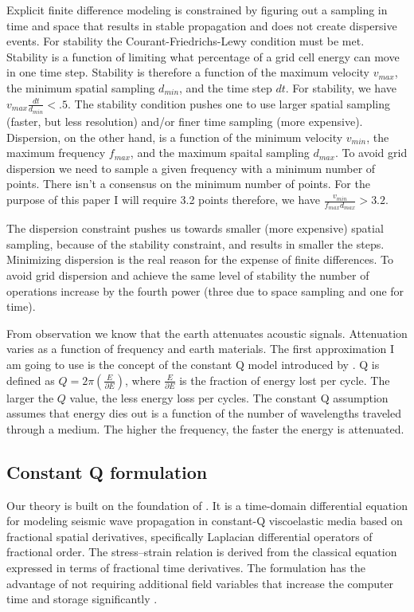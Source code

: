 \documentclass{paris17}
\begin{document}
Explicit finite difference modeling is constrained by figuring  out a sampling in time and space that results in stable propagation and does not create dispersive events.  For stability the Courant-Friedrichs-Lewy condition \cite[]{courant1967partial} must be met.  Stability is a function of limiting what percentage of a grid cell energy can move in one time step. Stability is therefore a function of the maximum velocity $v_{max}$, the minimum spatial sampling $d_{min}$, and the time step $dt$. For stability, we have $v_{max}\frac{dt}{d_{min}} < .5$.  The stability condition pushes one to use larger spatial sampling (faster, but less resolution) and/or finer time sampling (more expensive).  Dispersion, on the other hand, is a function of the minimum velocity $v_{min}$, the maximum frequency $f_{max}$, and the maximum spaital sampling $d_{max}$.   To avoid grid dispersion we need to  sample a given frequency with a minimum number of points.  There isn't a consensus on the minimum number
of points. For the purpose of this paper I will require  3.2  points therefore, we have $\frac{v_{min} }{f_{max}d_{max}} > 3.2 \label{eq:dispersion}$.

The dispersion constraint pushes us towards smaller (more expensive) spatial sampling, because of the stability constraint, and results in smaller the steps.  Minimizing dispersion is the real reason for the expense of finite differences.  To avoid grid dispersion and achieve the same level of stability the number of operations increase by the fourth power (three due to space sampling and one for time).

From observation we know that the earth attenuates acoustic signals.  Attenuation varies as a function of frequency and earth materials. The first approximation I am going to use is the concept of the constant Q model introduced by \cite{Kjartansson.sep.23}.  Q is defined as $Q=2 \pi \left( \frac{E}{\partial E}\right)$, where $\frac{E}{\partial E}$ is the fraction of energy lost per cycle. The larger the $Q$ value, the less energy loss per cycles.  The constant Q assumption assumes that energy dies out is a function of the number of wavelengths traveled through a medium. The higher the frequency, the faster the energy is attenuated.

\subsection{Constant Q formulation}

Our theory is built on the foundation of \cite[]{zhu2014theory}. It is a time-domain differential equation for modeling seismic wave propagation in constant-Q viscoelastic media based on fractional spatial derivatives, specifically Laplacian differential operators of fractional order.  The stress–strain relation is derived from the classical equation expressed in terms of fractional time derivatives. The formulation has the advantage of not requiring additional field variables that increase the computer time and storage significantly \cite[]{zhu2014theory}.
\end{document}
